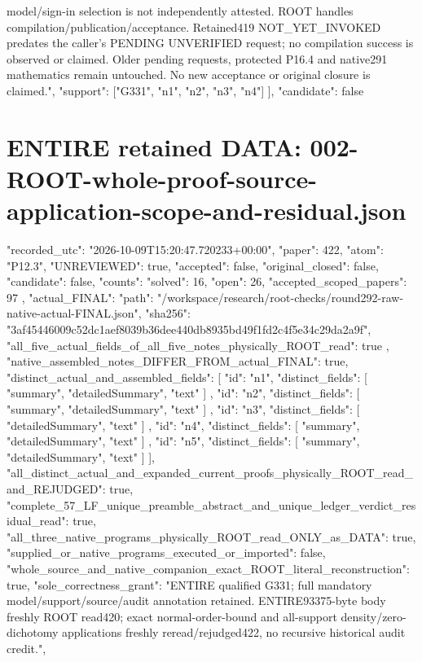 \documentclass[11pt]{article}
\begin{document}
\begin{Full422Data}
{{model/sign-in selection is not independently attested. ROOT handles compilation/publication/acceptance. Retained419 NOT_YET_INVOKED predates the caller's PENDING UNVERIFIED request; no compilation success is observed or claimed. Older pending requests, protected P16.4 and native291 mathematics remain untouched. No new acceptance or original closure is claimed.",
      "support": ["G331", "n1", "n2", "n3", "n4"]
    }
  ],
  "candidate": false
}
\end{Full422Data}
\section{ENTIRE retained DATA: 002-ROOT-whole-proof-source-application-scope-and-residual.json}
\begin{Full422Data}
{
  "recorded_utc": "2026-10-09T15:20:47.720233+00:00",
  "paper": 422,
  "atom": "P12.3",
  "UNREVIEWED": true,
  "accepted": false,
  "original_closed": false,
  "candidate": false,
  "counts": {
    "solved": 16,
    "open": 26,
    "accepted_scoped_papers": 97
  },
  "actual_FINAL": {
    "path": "/workspace/research/root-checks/round292-raw-native-actual-FINAL.json",
    "sha256": "3af45446009c52dc1aef8039b36dee440db8935bd49f1fd2c4f5e34c29da2a9f",
    "all_five_actual_fields_of_all_five_notes_physically_ROOT_read": true
  },
  "native_assembled_notes_DIFFER_FROM_actual_FINAL": true,
  "distinct_actual_and_assembled_fields": [
    {
      "id": "n1",
      "distinct_fields": [
        "summary",
        "detailedSummary",
        "text"
      ]
    },
    {
      "id": "n2",
      "distinct_fields": [
        "summary",
        "detailedSummary",
        "text"
      ]
    },
    {
      "id": "n3",
      "distinct_fields": [
        "detailedSummary",
        "text"
      ]
    },
    {
      "id": "n4",
      "distinct_fields": [
        "summary",
        "detailedSummary",
        "text"
      ]
    },
    {
      "id": "n5",
      "distinct_fields": [
        "summary",
        "detailedSummary",
        "text"
      ]
    }
  ],
  "all_distinct_actual_and_expanded_current_proofs_physically_ROOT_read_and_REJUDGED": true,
  "complete_57_LF_unique_preamble_abstract_and_unique_ledger_verdict_residual_read": true,
  "all_three_native_programs_physically_ROOT_read_ONLY_as_DATA": true,
  "supplied_or_native_programs_executed_or_imported": false,
  "whole_source_and_native_companion_exact_ROOT_literal_reconstruction": true,
  "sole_correctness_grant": "ENTIRE qualified G331; full mandatory model/support/source/audit annotation retained. ENTIRE93375-byte body freshly ROOT read420; exact normal-order-bound and all-support density/zero-dichotomy applications freshly reread/rejudged422, no recursive historical audit credit.",
}
\end{Full422Data}
\end{document}
